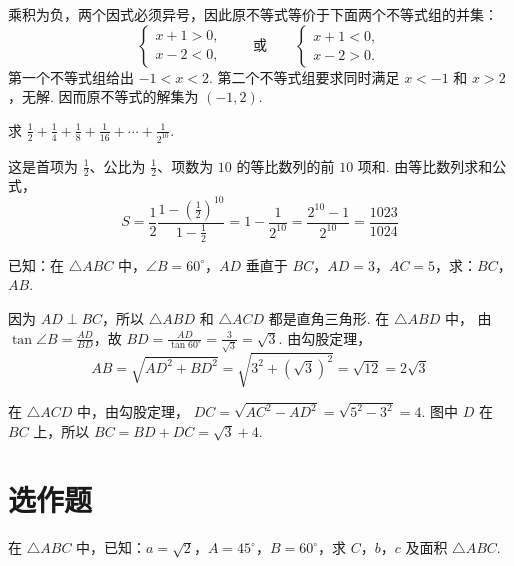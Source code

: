 \begin{solution}
乘积为负，两个因式必须异号，因此原不等式等价于下面两个不等式组的并集：
\[
\begin{cases}
x+1>0,\\
x-2<0,
\end{cases}
\qquad\text{或}\qquad
\begin{cases}
x+1<0,\\
x-2>0.
\end{cases}
\]
第一个不等式组给出 \(-1<x<2\). 第二个不等式组要求同时满足 \(x<-1\) 和 \(x>2\)，无解. 因而原不等式的解集为 \((-1,2)\).
\end{solution}

\begin{problem}
求 \(\frac{1}{2}+\frac{1}{4}+\frac{1}{8}+\frac{1}{16}+\cdots+\frac{1}{2^{10}}\).
\end{problem}

\begin{solution}
这是首项为 \(\frac{1}{2}\)、公比为 \(\frac{1}{2}\)、项数为 \(10\) 的等比数列的前 \(10\) 项和. 由等比数列求和公式，
\[
S=\frac{1}{2}\frac{1-\left(\frac{1}{2}\right)^{10}}{1-\frac{1}{2}}
 =1-\frac{1}{2^{10}}
 =\frac{2^{10}-1}{2^{10}}
 =\frac{1023}{1024}
\]
\end{solution}

\begin{problem}
已知：在 \(\triangle ABC\) 中，\(\angle B=60^{\circ}\)，\(AD\) 垂直于 \(BC\)，\(AD=3\)，\(AC=5\)，求：\(BC\)，\(AB\).

\end{problem}

\begin{solution}
因为 \(AD\perp BC\)，所以 \(\triangle ABD\) 和 \(\triangle ACD\) 都是直角三角形. 在 \(\triangle ABD\) 中，
由 \(\tan\angle B=\frac{AD}{BD}\)，故 \(BD=\frac{AD}{\tan60^{\circ}}=\frac{3}{\sqrt{3}}=\sqrt{3}\).
由勾股定理，
\[
AB=\sqrt{AD^{2}+BD^{2}}=\sqrt{3^{2}+\left(\sqrt{3}\right)^{2}}=\sqrt{12}=2\sqrt{3}
\]

在 \(\triangle ACD\) 中，由勾股定理，
\(DC=\sqrt{AC^{2}-AD^{2}}=\sqrt{5^{2}-3^{2}}=4\). 图中 \(D\) 在 \(BC\) 上，所以 \(BC=BD+DC=\sqrt{3}+4\).
\end{solution}

\section{选作题}

\begin{problem}
在 \(\triangle ABC\) 中，已知：\(a=\sqrt{2}\)，\(A=45^{\circ}\)，\(B=60^{\circ}\)，求 \(C\)，\(b\)，\(c\) 及面积 \(\triangle ABC\).

\end{problem}

